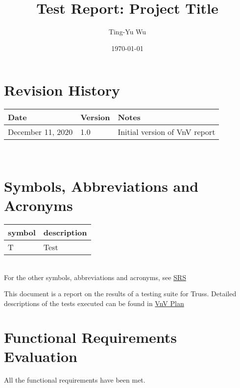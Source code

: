 \documentclass[12pt, titlepage]{article}
\begin{document}
\title{Test Report: Project Title} 
\author{Ting-Yu Wu}
\date{\today}
	
\maketitle


\section{Revision History}

\begin{tabularx}{\textwidth}{p{3.5cm}p{2cm}X}
\toprule {\bf Date} & {\bf Version} & {\bf Notes}\\
\midrule
December 11, 2020 & 1.0 & Initial version of VnV report\\
\bottomrule
\end{tabularx}

~\newpage

\section{Symbols, Abbreviations and Acronyms}

\renewcommand{\arraystretch}{1.2}
\begin{tabular}{l l} 
  \toprule		
  \textbf{symbol} & \textbf{description}\\
  \midrule 
  T & Test\\
  \bottomrule
\end{tabular}\\

For the other symbols, abbreviations and acronyms, see 
\href{https://github.com/tingyuw/cas741/blob/master/docs/SRS/SRS.pdf}{SRS}

\newpage

\tableofcontents

\listoftables %

\newpage


This document is a report on the results of a testing suite for Truss. Detailed 
descriptions of the tests executed can be found in 
\href{https://github.com/tingyuw/cas741/blob/master/docs/VnVPlan/VnVPlan.pdf}{VnV
 Plan}
\section{Functional Requirements Evaluation} \label{funcreq}
All the functional requirements have been met.
\end{document}

